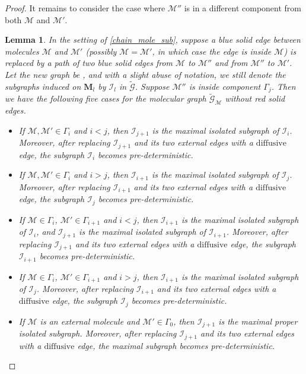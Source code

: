 \documentclass{article}
\newcommand{\1}{\mathds{1}}
\numberwithin{equation}{section}
\renewcommand{\cal}{\mathcal}
\newcommand{\wt}{\widetilde}
\newcommand{\dashed}{\text{diffusive}}
\theoremstyle{plain} %
\newtheorem{lemma}[theorem]{Lemma}
\theoremstyle{remark}
\newcommand{\Pol}{{\mathbf{M}}}
\newcommand{\Iso}{{\mathcal I}}
\begin{document}
\begin{proof}
It remains to consider the case where $\cal M''$ is in a different component from both $\cal M$ and $\cal M'$. %



\begin{lemma}\label{hard lemmQ}
In the setting of \eqref{chain_mole_sub}, suppose a blue solid edge between molecules $\cal M$ and $\cal M'$ (possibly $\cal M=\cal M'$, in which case the edge is inside $\cal M$) is replaced by a path of two blue solid edges from $\cal M$ to $\cal M''$ and from $\cal M''$ to $\cal M'$. Let the new graph be \smash{$\wt{\cal G}$}, and with a slight abuse of notation, we still denote the subgraphs induced on $\Pol_l$ by $\Iso_l$ in $\wt {\cal G}$. Suppose $\cal M''$ is inside component $\Gamma_j$.  Then we have the following five cases for the molecular graph $\wt {\cal G}_{\cal M}$ without red solid edges.
\begin{itemize}
\item[(i)] If $\cal M,\cal M' \in \Gamma_i$ and $i<j$, then $\Iso_{j+1}$ is the maximal isolated subgraph of $\Iso_i$. Moreover, after replacing $\Iso_{j+1}$ and its two external edges with a $\dashed$ edge, the subgraph $\Iso_i$ becomes pre-deterministic.
 
\item[(ii)] If $\cal M,\cal M' \in \Gamma_i$ and $i>j$, then $\Iso_{i+1}$ is the maximal isolated subgraph of $\Iso_j$. Moreover, after replacing $\Iso_{i+1}$ and its two external edges with a $\dashed$ edge, the subgraph $\Iso_j$ becomes pre-deterministic.
 
 \item[(iii)] If $\cal M\in \Gamma_i$, $\cal M'\in \Gamma_{i+1}$ and $i<j$, then $\Iso_{i+1}$ is the maximal isolated subgraph of $\Iso_i$, and $\Iso_{j+1}$ is the maximal isolated subgraph of $\Iso_{i+1}$. Moreover, after replacing $\Iso_{j+1}$ and its two external edges with a $\dashed$ edge, the subgraph $\Iso_{i+1}$ becomes pre-deterministic.
 
 \item[(iv)] If $\cal M\in \Gamma_i$, $\cal M'\in \Gamma_{i+1}$ and $i>j$, then $\Iso_{i+1}$ is the maximal isolated subgraph of $\Iso_j$. Moreover, after replacing $\Iso_{i+1}$ and its two external edges with a $\dashed$ edge, the subgraph $\Iso_{j}$ becomes pre-deterministic.

\item[(v)] If $\cal M$ is an external molecule and $\cal M'\in \Gamma_0$, then $\Iso_{j+1}$ is the maximal proper isolated subgraph. Moreover, after replacing $\Iso_{j+1}$ and its two external edges with a $\dashed$ edge, the maximal subgraph \smash{$\wt{\cal G}_{\max}$} becomes pre-deterministic.
\end{itemize}
\end{lemma}


\end{proof}
\end{document}
